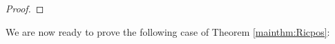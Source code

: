 \documentclass{amsart}
\let\epsilon\varepsilon
\numberwithin{equation}{section}
\theoremstyle{plain}
\theoremstyle{definition}
\theoremstyle{remark}
\numberwithin{table}{section}
\begin{document}
\begin{proof}
    \end{proof}
    

    We are now ready to prove the following case of Theorem \ref{mainthm:Ricpos}:
\end{document}
